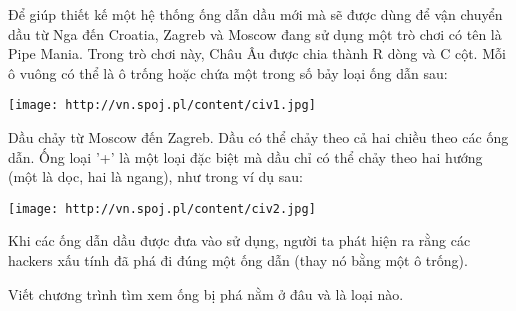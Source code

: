 Để giúp thiết kế một hệ thống ống dẫn dầu mới mà sẽ được dùng để vận chuyển dầu từ Nga đến Croatia, Zagreb và Moscow đang sử dụng một trò chơi có tên là Pipe Mania. Trong trò chơi này, Châu Âu được chia thành R dòng và C cột. Mỗi ô vuông có thể là ô trống hoặc chứa một trong số bảy loại ống dẫn sau:  


\texttt{[image: http://vn.spoj.pl/content/civ1.jpg]}

   Dầu chảy từ Moscow đến Zagreb. Dầu có thể chảy theo cả hai chiều theo các ống dẫn. Ống loại '+' là một loại đặc biệt mà dầu chỉ có thể chảy theo hai hướng (một là dọc, hai là ngang), như trong ví dụ sau:  


\texttt{[image: http://vn.spoj.pl/content/civ2.jpg]}

   Khi các ống dẫn dầu được đưa vào sử dụng, người ta phát hiện ra rằng các hackers xấu tính đã phá đi đúng một ống dẫn (thay nó bằng một ô trống).  

   Viết chương trình tìm xem ống bị phá nằm ở đâu và là loại nào.  

\
